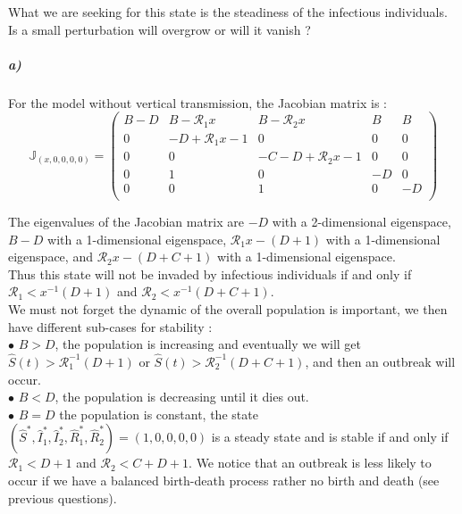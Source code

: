 \documentclass{article}
\begin{document}
What we are seeking for this state is the steadiness of the infectious individuals. Is a small perturbation will overgrow or will it vanish ? \\

\subparagraph{a)}
For the model without vertical transmission, the Jacobian matrix is : 
$$
\mathbb{J}_{(x,0,0,0,0)}=
\left(
\begin{array}{ccccc}
 B-D & B-\pmb{\mathcal{R}}_1 x & B-\pmb{\mathcal{R}}_2 x & B & B \\
 0 & -D+\pmb{\mathcal{R}}_1 x-1 & 0 & 0 & 0 \\
 0 & 0 & -C-D+\pmb{\mathcal{R}}_2 x-1 & 0 & 0 \\
 0 & 1 & 0 & -D & 0 \\
 0 & 0 & 1 & 0 & -D \\
\end{array}
\right)
$$

The eigenvalues of the Jacobian matrix are $-D$ with a 2-dimensional eigenspace, $B-D$ with a 1-dimensional eigenspace, $\pmb{\mathcal{R}}_1 x-(D+1)$ with a 1-dimensional eigenspace, and $\pmb{\mathcal{R}}_2 x-(D+C+1)$ with a 1-dimensional eigenspace. \\

Thus this state will not be invaded by infectious individuals if and only if $\pmb{\mathcal{R}}_1<x^{-1}(D+1)$ and  $\pmb{\mathcal{R}}_2<x^{-1}(D+C+1)$. \\

We must not forget the dynamic of the overall population is important, we then have different sub-cases for stability : \\

$\bullet$ $B>D$, the population is increasing and eventually we will get $\widehat{S}(t)>\pmb{\mathcal{R}}_1^{-1}(D+1)$ or $\widehat{S}(t)>\pmb{\mathcal{R}}_2^{-1}(D+C+1)$, and then an outbreak will occur.\\

$\bullet$ $B<D$, the population is decreasing until it dies out. \\

$\bullet$ $B=D$ the population is constant, the state $(\widehat{S}^*,\widehat{I}_1^*,\widehat{I}_2^*,\widehat{R}_1^*,\widehat{R}_2^*)=(1,0,0,0,0)$ is a steady state and is stable if and only if $\pmb{\mathcal{R}}_1<D+1$ and  $\pmb{\mathcal{R}}_2<C+D+1$. We notice that an outbreak is less likely to occur if we have a balanced birth-death process rather no birth and death (see previous questions). \\
\end{document}

